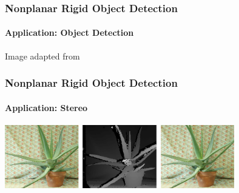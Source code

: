 \documentclass[xetex,professionalfont]{beamer}
\begin{document}

{
\begin{frame}


\end{frame}
}


\begin{frame}\label{sift-object-detection}
\frametitle{Nonplanar Rigid Object Detection}
\framesubtitle{Application: Object Detection}

\begin{center}
    {\centering Image adapted from \cite{lowe2004}}
\end{center}

\end{frame}


\begin{frame}
\frametitle{Nonplanar Rigid Object Detection}
\framesubtitle{Application: Stereo}

\begin{center}
\includegraphics[width=10cm]{figures/opencv-stereo.jpg}
\end{center}

\end{frame}
\end{document}
